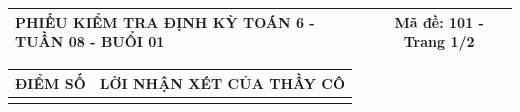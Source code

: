 \documentclass[12pt,a4paper]{article}
\begin{document}
\pagestyle{empty}

\noindent
\begin{tabularx}{\linewidth}{|X|c|}
\hline
\textbf{PHIẾU KIỂM TRA ĐỊNH KỲ TOÁN 6 - TUẦN 08 - BUỔI 01} & \textbf{Mã đề: 101 - Trang 1/2} \\
\hline
\end{tabularx}

\vspace{1mm}

\noindent
\begin{tabularx}{\linewidth}{|p{3.2cm}|X|}
\hline
\centering\textbf{ĐIỂM SỐ} & \centering\textbf{LỜI NHẬN XÉT CỦA THẦY CÔ} \tabularnewline
\hline
\rule{0pt}{1.8cm} & \tabularnewline
\hline
\end{tabularx}

\vspace{1.2mm}
\end{document}
